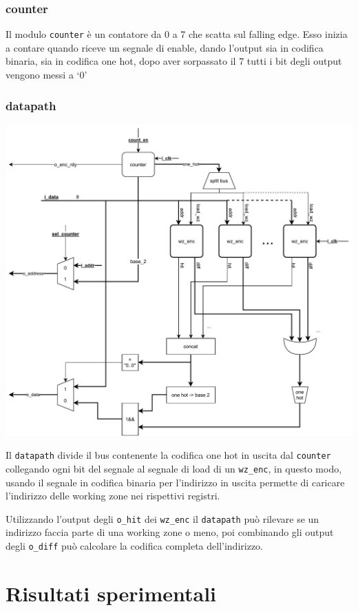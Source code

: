 \documentclass[a4paper,twocolumn]{article}
\begin{document}
\subsubsection{counter}

Il modulo \texttt{counter} è un contatore da 0 a 7 che scatta sul falling edge. Esso inizia a contare quando riceve un segnale di enable, dando l'output sia in codifica binaria, sia in codifica one hot, dopo aver sorpassato il 7 tutti i bit degli output vengono messi a `0'

\subsubsection{datapath}
\includegraphics[width=\linewidth]{schema-datapath.pdf}

Il \texttt{datapath} divide il bus contenente la codifica one hot in uscita dal \texttt{counter} collegando ogni bit del segnale al segnale di load di un \texttt{wz\_enc}, in questo modo, usando il segnale in codifica binaria per l'indirizzo in uscita permette di caricare l'indirizzo delle working zone nei rispettivi registri. 

Utilizzando l'output degli \texttt{o\_hit} dei \texttt{wz\_enc} il \texttt{datapath} può rilevare se un indirizzo faccia parte di una working zone o meno, poi combinando gli output degli \texttt{o\_diff} può calcolare la codifica completa dell'indirizzo.


\section{Risultati sperimentali}
\end{document}
